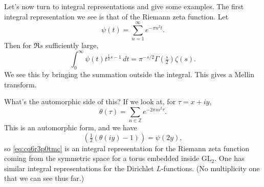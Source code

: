 \documentclass[reqno]{amsart} 
\begin{document}
Let's now turn to integral representations and give some examples.  The first integral representation we see is that of the Riemann zeta function.  Let
\begin{equation}\label{eq:cq6r3qe33m}
  \psi(t) = \sum_{n = 1}^\infty e^{- \pi n^2 t}.
\end{equation}
Then for $\Re s$ sufficiently large,
\begin{equation}\label{eq:cq6r3p0tmc}
  \int_0^\infty \psi(t) t^{\frac{1}{2} s - 1} \, d t
  = \pi^{- s/2} \Gamma(\tfrac{s}{2}) \zeta(s).
\end{equation}
We see this by bringing the summation outside the integral.  This gives a Mellin transform.

What's the automorphic side of this?  If we look at, for $\tau = x + i y$,
\begin{equation*}
  \theta(\tau) = \sum_{n \in \mathbb{Z}} e^{- 2 \pi i n^2 \tau}.
\end{equation*}
This is an automorphic form, and we have
\begin{equation*}
  (\tfrac{1}{2}(\theta(i y) - 1)) = \psi(2 y),
\end{equation*}
so \eqref{eq:cq6r3p0tmc} is an integral representation for the Riemann zeta function coming from the symmetric space for a torus embedded inside $\mathrm{GL}_2$.  One has similar integral representations for the Dirichlet $L$-functions.  (No multiplicity one that we can see thus far.)
\end{document}
